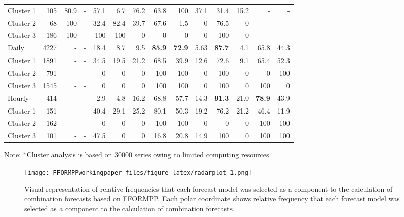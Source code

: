 \documentclass[11pt,a4paper,]{article}
\begin{document}
\begin{table}[!h]
\begin{threeparttable}
\begin{tabular}{l|r|rrrrrrrrrrrr}
 Cluster 1& 105 &80.9  & - & 57.1 & 6.7 & 76.2 & 63.8 & 100 & 37.1 & 31.4 &15.2  & - &-  \\ 
 Cluster 2& 68 & 100 & - & 32.4 & 82.4 & 39.7 & 67.6 & 1.5 & 0 & 76.5 & 0 & - & - \\ 
Cluster 3& 186 & 100 & - & 100 & 100 & 0 &  0& 0 & 0 & 100 & 0 & - &  -\\ \hline
 Daily & 4227 & - & - & 18.4 & 8.7 & 9.5 & \textbf{85.9} & \textbf{72.9} & 5.63 & \textbf{87.7} & 4.1 & 65.8 & 44.3 \\ 
 Cluster 1& 1891 & - & - & 34.5 & 19.5 & 21.2 &68.5  & 39.9 & 12.6 & 72.6 & 9.1 & 65.4 & 52.3 \\ 
 Cluster 2& 791 & - & - &  0&  0& 0 & 100 & 100 & 0 &100  & 0 &  0& 100 \\ 
  Cluster 3& 1545 & - & - & 0 & 0 & 0 & 100 & 100 & 0 & 100 & 0 & 100 &  0\\ \hline
 Hourly & 414 & - &  -& 2.9 & 4.8 & 16.2 & 68.8 & 57.7 & 14.3 & \textbf{91.3} & 21.0 & \textbf{78.9} & 43.9 \\ 
 Cluster 1& 151 & - & - & 40.4 & 29.1 & 25.2 & 80.1 & 50.3 & 19.2 & 76.2 & 21.2 &46.4  & 11.9 \\
Cluster 2 & 162 & - & - & 0 & 0 & 0 & 100 & 100 & 0 & 0 & 0 & 100 & 100 \\ 
Cluster 3& 101 & - & - & 47.5 & 0 & 0 & 16.8 & 20.8 & 14.9 &  100& 0 & 100 & 100 \\ \hline
\end{tabular}
    \begin{tablenotes}
      \item\label{tnote:robots-r1} Note: *Cluster analysis is based on 30000 series owing to limited computing resources.
    \end{tablenotes}
  \end{threeparttable}
\end{table}

\begin{figure}
\centering
\texttt{[image: FFORMPPworkingpaper\_files/figure-latex/radarplot-1.png]}
\caption{\label{fig:radarplot}Visual representation of relative frequencies that each forecast model was selected as a component to the calculation of combination forecasts based on FFORMPP. Each polar coordinate shows relative frequency that each forecast model was selected as a component to the calculation of combination forecasts.}
\end{figure}
\end{document}
